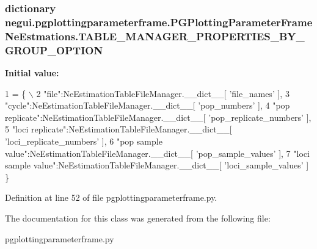 \subsubsection[{\texorpdfstring{T\+A\+B\+L\+E\+\_\+\+M\+A\+N\+A\+G\+E\+R\+\_\+\+P\+R\+O\+P\+E\+R\+T\+I\+E\+S\+\_\+\+B\+Y\+\_\+\+G\+R\+O\+U\+P\+\_\+\+O\+P\+T\+I\+ON}{TABLE_MANAGER_PROPERTIES_BY_GROUP_OPTION}}]{\setlength{\rightskip}{0pt plus 5cm}dictionary negui.\+pgplottingparameterframe.\+P\+G\+Plotting\+Parameter\+Frame\+Ne\+Estmations.\+T\+A\+B\+L\+E\+\_\+\+M\+A\+N\+A\+G\+E\+R\+\_\+\+P\+R\+O\+P\+E\+R\+T\+I\+E\+S\+\_\+\+B\+Y\+\_\+\+G\+R\+O\+U\+P\+\_\+\+O\+P\+T\+I\+ON\hspace{0.3cm}{\ttfamily [static]}}\hypertarget{classnegui_1_1pgplottingparameterframe_1_1PGPlottingParameterFrameNeEstmations_af5a035e4b725e1342f257054fdaa4c91}{}\label{classnegui_1_1pgplottingparameterframe_1_1PGPlottingParameterFrameNeEstmations_af5a035e4b725e1342f257054fdaa4c91}
{\bfseries Initial value\+:}
\begin{DoxyCode}
1 = \{ \(\backslash\)
2             \textcolor{stringliteral}{"file"}:NeEstimationTableFileManager.\_\_dict\_\_[ \textcolor{stringliteral}{'file\_names'} ],
3             \textcolor{stringliteral}{"cycle"}:NeEstimationTableFileManager.\_\_dict\_\_[ \textcolor{stringliteral}{'pop\_numbers'} ],
4             \textcolor{stringliteral}{"pop replicate"}:NeEstimationTableFileManager.\_\_dict\_\_[ \textcolor{stringliteral}{'pop\_replicate\_numbers'} ],
5             \textcolor{stringliteral}{"loci replicate"}:NeEstimationTableFileManager.\_\_dict\_\_[ \textcolor{stringliteral}{'loci\_replicate\_numbers'} ],
6             \textcolor{stringliteral}{"pop sample value"}:NeEstimationTableFileManager.\_\_dict\_\_[ \textcolor{stringliteral}{'pop\_sample\_values'} ],
7             \textcolor{stringliteral}{"loci sample value"}:NeEstimationTableFileManager.\_\_dict\_\_[ \textcolor{stringliteral}{'loci\_sample\_values'} ] \}
\end{DoxyCode}


Definition at line 52 of file pgplottingparameterframe.\+py.



The documentation for this class was generated from the following file\+:\begin{DoxyCompactItemize}
\item 
pgplottingparameterframe.\+py\end{DoxyCompactItemize}
